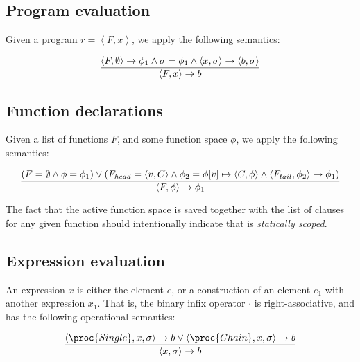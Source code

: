 \subsection{Program evaluation}

Given a program $r=\left\langle F,x \right\rangle$, we apply the following
semantics:

\begin{equation}\label{sem:declaration}
{\displaystyle
    \left\langle F,\emptyset\right\rangle
    \rightarrow
    \phi_1
  \wedge
    \sigma=\phi_1
  \wedge
    \left\langle x,\sigma\right\rangle
    \rightarrow
    \left\langle b,\sigma\right\rangle
\over\displaystyle
  \left\langle F, x\right\rangle
  \rightarrow
  b
}
\end{equation}

\subsection{Function declarations}

Given a list of functions $F$, and some function space $\phi$, we apply the
following semantics:

\begin{equation}\label{sem:declaration}
{\displaystyle
  \left(
      F=\emptyset
    \wedge
      \phi=\phi_1
  \right)
  \vee
  \left(
      F_{head}=\left\langle v,C\right\rangle
    \wedge
      \phi_2=\phi[v]\mapsto \left\langle C,\phi\right\rangle
    \wedge
      \left\langle F_{tail},\phi_2\right\rangle
      \rightarrow
      \phi_1
  \right)
\over\displaystyle
  \left\langle F, \phi\right\rangle
  \rightarrow
  \phi_1
}
\end{equation}

The fact that the active function space is saved together with the list of
clauses for any given function should intentionally indicate that \D{} is
\emph{statically scoped}.

\subsection{Expression evaluation}

An expression $x$ is either the element $e$, or a construction of an element
$e_1$ with another expression $x_1$. That is, the binary infix operator $\cdot$
is right-associative, and has the following operational semantics:

\everymath{\displaystyle}

\begin{equation}
{\displaystyle
  \left\langle \proc{Single}, x,\sigma\right\rangle
  \rightarrow
  b
\vee
  \left\langle \proc{Chain}, x,\sigma\right\rangle
  \rightarrow
  b
\over\displaystyle
  \left\langle x,\sigma\right\rangle
  \rightarrow
  b
}
\end{equation}

